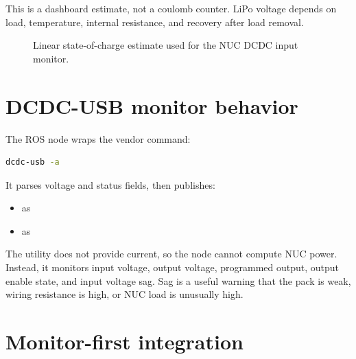 This is a dashboard estimate, not a coulomb counter. LiPo voltage depends on load, temperature, internal resistance, and recovery after load removal.

\begin{figure}[htbp]
\centering
{}
\caption{Linear state-of-charge estimate used for the NUC DCDC input monitor.}
\end{figure}

\section{DCDC-USB monitor behavior}

The ROS node  wraps the vendor command:

\begin{lstlisting}[language=bash]
dcdc-usb -a
\end{lstlisting}

It parses voltage and status fields, then publishes:

\begin{itemize}
  \item {} as 
  \item {} as 
\end{itemize}

The utility does not provide current, so the node cannot compute NUC power. Instead, it monitors input voltage, output voltage, programmed output, output enable state, and input voltage sag. Sag is a useful warning that the pack is weak, wiring resistance is high, or NUC load is unusually high.

\section{Monitor-first integration}

